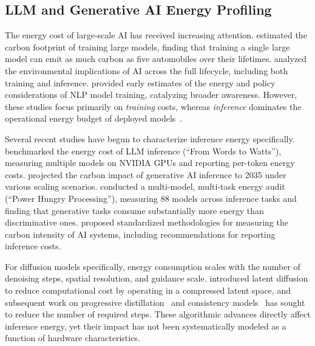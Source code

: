 \documentclass[review,12pt,authoryear]{elsarticle}
\begin{document}
\subsection{LLM and Generative AI Energy Profiling}
\label{sec:rw_energy_profiling}

The energy cost of large-scale AI has received increasing attention.
\citet{patterson2021carbon} estimated the carbon footprint of training large models, finding that training a single large model can emit as much carbon as five automobiles over their lifetimes.
\citet{wu2022sustainable} analyzed the environmental implications of AI across the full lifecycle, including both training and inference.
\citet{strubell2019energy} provided early estimates of the energy and policy considerations of NLP model training, catalyzing broader awareness.
However, these studies focus primarily on \emph{training} costs, whereas \emph{inference} dominates the operational energy budget of deployed models~\citep{desislavov2023trends}.

Several recent studies have begun to characterize inference energy specifically.
\citet{samsi2023words} benchmarked the energy cost of LLM inference (``From Words to Watts''), measuring multiple models on NVIDIA GPUs and reporting per-token energy costs.
\citet{chien2023reducing} projected the carbon impact of generative AI inference to 2035 under various scaling scenarios.
\citet{luccioni2024power} conducted a multi-model, multi-task energy audit (``Power Hungry Processing''), measuring 88 models across inference tasks and finding that generative tasks consume substantially more energy than discriminative ones.
\citet{dodge2022measuring} proposed standardized methodologies for measuring the carbon intensity of AI systems, including recommendations for reporting inference costs.

For diffusion models specifically, energy consumption scales with the number of denoising steps, spatial resolution, and guidance scale.
\citet{rombach2022high} introduced latent diffusion to reduce computational cost by operating in a compressed latent space, and subsequent work on progressive distillation~\citep{salimans2022progressive} and consistency models~\citep{song2023consistency} has sought to reduce the number of required steps.
These algorithmic advances directly affect inference energy, yet their impact has not been systematically modeled as a function of hardware characteristics.
\end{document}
